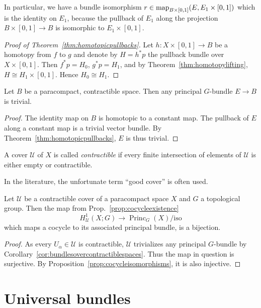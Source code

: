 \documentclass[a4paper,openany]{scrbook}
\DeclareMathOperator{\Princ}{Princ}
\begin{document}
In particular, we have a bundle isomorphism $r\in \operatorname{map}_{B \times [0,1]}(E, E_1 \times [0,1])$ which is the identity on $E_1$, because the pullback of $E_1$ along the projection $B \times [0,1] \to B$ is isomorphic to $E_1 \times [0,1]$.

\begin{proof}[Proof of Theorem~\ref{thm:homotopicpullbacks}]
Let $h\colon X \times [0,1] \to B$ be a homotopy from $f$ to $g$ and denote by $H = h^*p$ the pullback bundle over $X \times [0,1]$. Then $f^*p = H_0$, $g^*p=H_1$, and by Theorem~\ref{thm:homotopylifting}, $H \cong H_1 \times [0,1]$. Hence $H_0 \cong H_1$.
\end{proof}

\begin{corollary}\label{cor:bundlesovercontractiblespaces}
Let $B$ be a paracompact, contractible space. Then any principal $G$-bundle $E \to B$ is trivial.
\end{corollary}
\begin{proof}
The identity map on $B$ is homotopic to a constant map. The pullback of $E$ along a constant map is a trivial vector bundle. By Theorem~\ref{thm:homotopicpullbacks}, $E$ is thus trivial.
\end{proof}

\begin{defn} A cover $\mathcal U$ of $X$ is called \emph{contractible} if every finite intersection of elements of $\mathcal U$ is either empty or contractible. 
\end{defn}

In the literature, the unfortunate term ``good cover'' is often used.

\begin{corollary}\label{cor:H1realizedoncontractiblecovers}
Let $\mathcal U$ be a contractible cover of a paracompact space $X$ and $G$ a topological group. Then the map from Prop.~\ref{prop:cocycleexistence}
\[
H^1_{\mathcal U}(X;G) \to \Princ_G(X)/\text{iso}
\]
which maps a cocycle to its associated principal bundle, is a bijection.
\end{corollary}
\begin{proof}
As every $U_\alpha \in \mathcal U$ is contractible, $\mathcal U$ trivializes any principal $G$-bundle by Corollary~\ref{cor:bundlesovercontractiblespaces}. Thus the map in question is surjective. By Proposition~\ref{prop:cocycleisomorphisms}, it is also injective.
\end{proof}

\section{Universal bundles}
\end{document}
